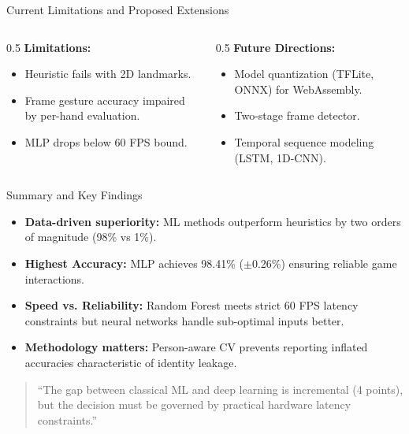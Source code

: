 \documentclass[10pt, aspectratio=169]{beamer}
\begin{document}
\begin{frame}{Current Limitations and Proposed Extensions}
    \begin{columns}
        \begin{column}{0.5\textwidth}
            \textbf{Limitations:}
            \begin{itemize}
                \item Heuristic fails with 2D landmarks.
                \item Frame gesture accuracy impaired by per-hand evaluation.
                \item MLP drops below 60 FPS bound.
            \end{itemize}
        \end{column}
        \begin{column}{0.5\textwidth}
            \textbf{Future Directions:}
            \begin{itemize}
                \item Model quantization (TFLite, ONNX) for WebAssembly.
                \item Two-stage frame detector.
                \item Temporal sequence modeling (LSTM, 1D-CNN).
            \end{itemize}
        \end{column}
    \end{columns}
\end{frame}

\begin{frame}{Summary and Key Findings}
    \begin{itemize}
        \item \textbf{Data-driven superiority:} ML methods outperform heuristics by two orders of magnitude (98\% vs 1\%).
        \item \textbf{Highest Accuracy:} MLP achieves 98.41\% ($\pm$0.26\%) ensuring reliable game interactions.
        \item \textbf{Speed vs. Reliability:} Random Forest meets strict 60 FPS latency constraints but neural networks handle sub-optimal inputs better.
        \item \textbf{Methodology matters:} Person-aware CV prevents reporting inflated accuracies characteristic of identity leakage.
    \end{itemize}
    \vspace{0.4cm}
    \begin{center}
        \begin{quote}
            ``The gap between classical ML and deep learning is incremental (4 points), but the decision must be governed by practical hardware latency constraints.''
        \end{quote}
    \end{center}
\end{frame}
\end{document}
